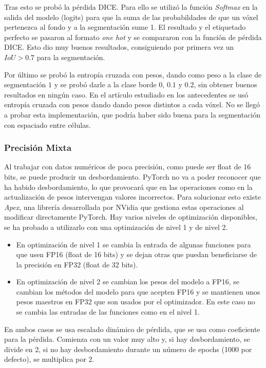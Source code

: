 Tras esto se probó la pérdida DICE. Para ello se utilizó la función \textit{Softmax} en la salida del modelo (logits) para que la suma de las probabildades de que un vóxel pertenezca al fondo y a la segmentación sume 1. El resultado y el etiquetado perfecto se pasaron al formato \textit{one hot} y se compararon con la función de pérdida DICE. Esto dio muy buenos resultados, consiguiendo por primera vez un $IoU>0.7$ para la segmentación.

Por último se probó la entropía cruzada con pesos, dando como peso a la clase de segmentación $1$ y se probó darle a la clase borde $0$, $0.1$ y $0.2$, sin obtener buenos resultados en ningún caso. En el artículo estudiado en los antecedentes \cite{Falk2019} se usó entropía cruzada con pesos dando dando pesos distintos a cada vóxel. No se llegó a probar esta implementación, que podría haber sido buena para la segmentación con espaciado entre células.

\subsubsection{Precisión Mixta}

Al trabajar con datos numéricos de poca precisión, como puede ser float de 16 bits, se puede producir un desbordamiento. PyTorch no va a poder reconocer que ha habido desbordamiento, lo que provocará que en las operaciones como en la actualización de pesos intervengan valores incorrectos. Para solucionar esto existe \textit{Apex}, una librería desarrollada por NVidia que gestiona estas operaciones al modificar directamente PyTorch. Hay varios niveles de optimización disponibles, se ha probado a utilizarlo con una optimización de nivel 1 y de nivel 2.
\begin{itemize}
\item En optimización de nivel 1 se cambia la entrada de algunas funciones para que usen FP16 (float de 16 bits) y se dejan otras que puedan beneficiarse de la precisión en FP32 (float de 32 bits).
\item En optimización de nivel 2 se cambian los pesos del modelo a FP16, se cambian los métodos del modelo para que acepten FP16 y se mantienen unos pesos maestros en FP32 que son usados por el optimizador. En este caso no se cambia las entradas de las funciones como en el nivel 1.
\end{itemize}

En ambos casos se usa escalado dinámico de pérdida, que se usa como coeficiente para la pérdida. Comienza con un valor muy alto y, si hay desbordamiento, se divide en 2, si no hay desbordamiento durante un número de epochs (1000 por defecto), se multiplica por 2.

